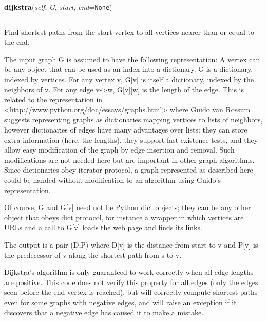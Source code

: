     \label{Epigrass:simobj:graph:dijkstra}

    \vspace{0.5ex}

    \begin{boxedminipage}{\textwidth}

    \raggedright \textbf{dijkstra}(\textit{self}, \textit{G}, \textit{start}, \textit{end}=\texttt{None})

    \vspace{-1.5ex}

    \rule{\textwidth}{0.5\fboxrule}
    Find shortest paths from the start vertex to all vertices nearer than 
    or equal to the end.

    The input graph G is assumed to have the following representation: A 
    vertex can be any object that can be used as an index into a 
    dictionary.  G is a dictionary, indexed by vertices.  For any vertex v,
    G[v] is itself a dictionary, indexed by the neighbors of v.  For any 
    edge v-{\textgreater}w, G[v][w] is the length of the edge.  This is 
    related to the representation in 
    {\textless}http://www.python.org/doc/essays/graphs.html{\textgreater} 
    where Guido van Rossum suggests representing graphs as dictionaries 
    mapping vertices to lists of neighbors, however dictionaries of edges 
    have many advantages over lists: they can store extra information 
    (here, the lengths), they support fast existence tests, and they allow 
    easy modification of the graph by edge insertion and removal.  Such 
    modifications are not needed here but are important in other graph 
    algorithms. Since dictionaries obey iterator protocol, a graph 
    represented as described here could be handed without modification to 
    an algorithm using Guido's representation.

    Of course, G and G[v] need not be Python dict objects; they can be any 
    other object that obeys dict protocol, for instance a wrapper in which 
    vertices are URLs and a call to G[v] loads the web page and finds its 
    links.

    The output is a pair (D,P) where D[v] is the distance from start to v 
    and P[v] is the predecessor of v along the shortest path from s to v.

    Dijkstra's algorithm is only guaranteed to work correctly when all edge
    lengths are positive. This code does not verify this property for all 
    edges (only the edges seen before the end vertex is reached), but will 
    correctly compute shortest paths even for some graphs with negative 
    edges, and will raise an exception if it discovers that a negative edge
    has caused it to make a mistake.

    \vspace{1ex}

    \end{boxedminipage}

